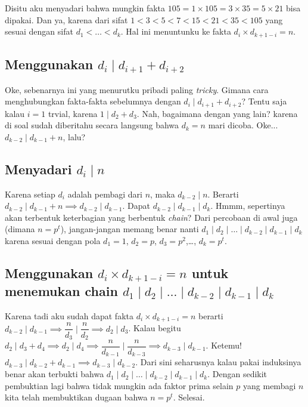 \documentclass[12pt]{scrartcl}
\begin{document}
 Disitu aku menyadari bahwa mungkin fakta $105 = 1 \times 105 = 3 \times 35 = 5 \times 21$ bisa dipakai. Dan ya, karena dari sifat $1 < 3 < 5 < 7 < 15 < 21 < 35 < 105$ yang sesuai dengan sifat $d_1 < \dots < d_k$. Hal ini menuntunku ke fakta $d_{i} \times d_{k+1-i}=n$.


\subsection{Menggunakan $d_i \mid d_{i+1} + d_{i+2}$}
Oke, sebenarnya ini yang menurutku pribadi paling \textit{tricky}. Gimana cara menghubungkan fakta-fakta sebelumnya dengan $d_i \mid d_{i+1} + d_{i+2}$? Tentu saja kalau $i=1$ trvial, karena $1 \mid d_2+d_3$. Nah, bagaimana dengan yang lain? karena di soal sudah diberitahu secara langsung bahwa $d_k=n$ mari dicoba. Oke... $d_{k-2} \mid d_{k-1} + n$, lalu? 

\subsection{Menyadari $d_i \mid n$}
Karena setiap $d_i$ adalah pembagi dari $n$, maka $d_{k-2} \mid n$. Berarti $d_{k-2} \mid d_{k-1} + n \implies d_{k-2} \mid d_{k-1}$. Dapat $d_{k-2} \mid d_{k-1} \mid d_k$. Hmmm, sepertinya akan terbentuk keterbagian yang berbentuk \textit{chain}? Dari percobaan di awal juga (dimana $n=p^t$), jangan-jangan memang benar nanti $d_1 \mid d_2 \mid \dots \mid d_{k-2} \mid d_{k-1} \mid d_k$ karena sesuai dengan pola $d_1 = 1$, $d_2=p$, $d_3=p^2$,\dots, $d_k=p^t$.

\subsection{Menggunakan $d_{i} \times d_{k+1-i}=n$ untuk menemukan chain $d_1 \mid d_2 \mid \dots \mid d_{k-2} \mid d_{k-1} \mid d_k$}
Karena tadi aku sudah dapat fakta $d_{i} \times d_{k+1-i}=n$ berarti $d_{k-2} \mid d_{k-1} \implies \dfrac{n}{d_{3}} \mid \dfrac{n}{d_{2}} \implies d_2 \mid d_3$. Kalau begitu $d_2 \mid d_3 + d_4 \implies d_2 \mid d_4 \implies \dfrac{n}{d_{k-1}} \mid \dfrac{n}{d_{k-3}} \implies d_{k-3} \mid d_{k-1}$. Ketemu! $d_{k-3} \mid d_{k-2} + d_{k-1} \implies d_{k-3} \mid d_{k-2}$. Dari sini seharusnya kalau pakai induksinya benar akan terbukti bahwa $d_1 \mid d_2 \mid \dots \mid d_{k-2} \mid d_{k-1} \mid d_k$. Dengan sedikit pembuktian lagi bahwa tidak mungkin ada faktor prima selain $p$ yang membagi $n$ kita telah membuktikan dugaan bahwa $n=p^t$. Selesai.
\end{document}
